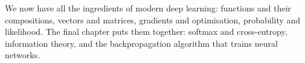We now have all the ingredients of modern deep learning: functions and their
compositions, vectors and matrices, gradients and optimisation, probability and
likelihood. The final chapter puts them together: softmax and cross-entropy,
information theory, and the backpropagation algorithm that trains neural
networks.
